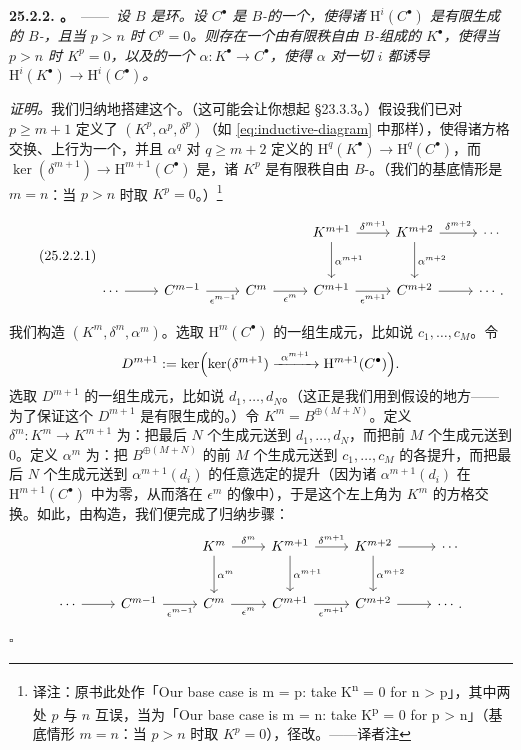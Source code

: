 \textbf{25.2.2. \trhLemma。}\ ——\ \emph{设 $B$ 是\trNoether{}环。设 $C^{\bullet}$ 是 $B$-\trModule{}的一个\trComplexN，使得诸 $\mathrm{H}^i(C^{\bullet})$ 是有限生成的 $B$-\trModule，且当 $p>n$ 时 $C^p=0$。则存在一个由有限秩自由 $B$-\trModule{}组成的\trComplexN{} $K^{\bullet}$，使得当 $p>n$ 时 $K^p=0$，以及\trComplexes{}的一个\trHomomorphism{} $\alpha\colon K^{\bullet}\to C^{\bullet}$，使得 $\alpha$ 对一切 $i$ 都诱导\trIsomorphism{} $\mathrm{H}^i(K^{\bullet})\to\mathrm{H}^i(C^{\bullet})$。}

\emph{证明。}\quad 我们归纳地搭建这个\trComplexN。（这可能会让你想起 \S23.3.3。）假设我们已对 $p\ge m+1$ 定义了 $(K^p,\alpha^p,\delta^p)$（如 \eqref{eq:inductive-diagram} 中那样），使得诸方格交换、上行为一个\trComplexN，并且 $\alpha^q$ 对 $q\ge m+2$ 定义\trCohomology{}的\trIsomorphism{} $\mathrm{H}^q(K^{\bullet})\to\mathrm{H}^q(C^{\bullet})$，而 $\ker(\delta^{m+1})\to\mathrm{H}^{m+1}(C^{\bullet})$ 是\trSurjectiveMap，诸 $K^p$ 是有限秩自由 $B$-\trModule。（我们的基底情形是 $m=n$：当 $p>n$ 时取 $K^p=0$。）\footnote{译注：原书此处作「Our base case is m = p: take K\textsuperscript{n} = 0 for n > p」，其中两处 $p$ 与 $n$ 互误，当为「Our base case is m = n: take K\textsuperscript{p} = 0 for p > n」（基底情形 $m=n$：当 $p>n$ 时取 $K^p=0$），径改。——译者注}

\begin{equation*}
\tag{25.2.2.1}\label{eq:inductive-diagram}
\begin{tikzcd}[row sep=2.6em, column sep=2.4em]
 & & & K^{m+1} \ar[r, "\delta^{m+1}"] \ar[d, "\alpha^{m+1}"] & K^{m+2} \ar[r, "\delta^{m+2}"] \ar[d, "\alpha^{m+2}"] & \cdots \\
\cdots \ar[r] & C^{m-1} \ar[r, "\epsilon^{m-1}"'] & C^{m} \ar[r, "\epsilon^{m}"'] & C^{m+1} \ar[r, "\epsilon^{m+1}"'] & C^{m+2} \ar[r] & \cdots.
\end{tikzcd}
\end{equation*}

我们构造 $(K^m,\delta^m,\alpha^m)$。选取 $\mathrm{H}^m(C^{\bullet})$ 的一组生成元，比如说 $c_1,\dots,c_M$。令
\[
D^{m+1}:=\ker\Bigl(\ker(\delta^{m+1})\xrightarrow{\ \alpha^{m+1}\ }\mathrm{H}^{m+1}(C^{\bullet})\Bigr).
\]
选取 $D^{m+1}$ 的一组生成元，比如说 $d_1,\dots,d_N$。（这正是我们用到\trNoether{}假设的地方——为了保证这个\trKernel{} $D^{m+1}$ 是有限生成的。）令 $K^m=B^{\oplus(M+N)}$。定义 $\delta^m\colon K^m\to K^{m+1}$ 为：把最后 $N$ 个生成元送到 $d_1,\dots,d_N$，而把前 $M$ 个生成元送到 $0$。定义 $\alpha^m$ 为：把 $B^{\oplus(M+N)}$ 的前 $M$ 个生成元送到 $c_1,\dots,c_M$ 的各提升，而把最后 $N$ 个生成元送到 $\alpha^{m+1}(d_i)$ 的任意选定的提升（因为诸 $\alpha^{m+1}(d_i)$ 在 $\mathrm{H}^{m+1}(C^{\bullet})$ 中为零，从而落在 $\epsilon^m$ 的像中），于是这个左上角为 $K^m$ 的方格交换。如此，由构造，我们便完成了归纳步骤：
\[
\begin{tikzcd}[row sep=2.6em, column sep=2.4em]
 & & K^{m} \ar[r, "\delta^{m}"] \ar[d, "\alpha^{m}"] & K^{m+1} \ar[r, "\delta^{m+1}"] \ar[d, "\alpha^{m+1}"] & K^{m+2} \ar[r] \ar[d, "\alpha^{m+2}"] & \cdots \\
\cdots \ar[r] & C^{m-1} \ar[r, "\epsilon^{m-1}"'] & C^{m} \ar[r, "\epsilon^{m}"'] & C^{m+1} \ar[r, "\epsilon^{m+1}"'] & C^{m+2} \ar[r] & \cdots.
\end{tikzcd}
\]
\hfill$\square$

